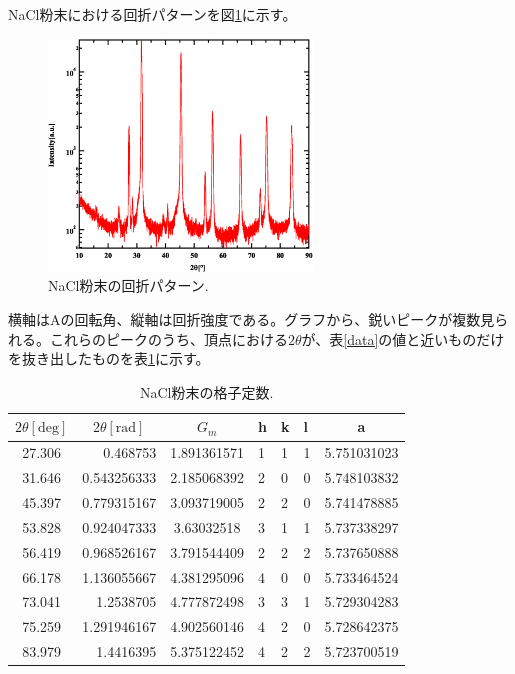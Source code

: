 \documentclass[11pt,a4j,uplatex]{jsarticle}
\begin{document}
NaCl粉末における回折パターンを図\ref{powder}に示す。

\begin{figure}[htb]
 \centering
 \includegraphics[clip,width=7cm]{FigPowder.eps}
 \caption{NaCl粉末の回折パターン.}
 \label{powder}
\end{figure}

横軸はAの回転角、縦軸は回折強度である。グラフから、鋭いピークが複数見られる。これらのピークのうち、頂点における$2\theta$が、表\ref{data}の値と近いものだけを抜き出したものを表\ref{pow}に示す。

\begin{table}[htbp]
 \begin{center}
  \caption{NaCl粉末の格子定数.}
  \begin{tabular}{|c|r|c|lll|c|}  \hline
   $2\theta[\mathrm{deg}]$ & \multicolumn{1}{c|}{$2\theta[\mathrm{rad}]$} & $G_{m}$     & h & k & l & a           \\ \hline  \hline
   27.306                  & 0.468753                                     & 1.891361571 & 1 & 1 & 1 & 5.751031023 \\
   31.646                  & 0.543256333                                  & 2.185068392 & 2 & 0 & 0 & 5.748103832 \\
   45.397                  & 0.779315167                                  & 3.093719005 & 2 & 2 & 0 & 5.741478885 \\
   53.828                  & 0.924047333                                  & 3.63032518  & 3 & 1 & 1 & 5.737338297 \\
   56.419                  & 0.968526167                                  & 3.791544409 & 2 & 2 & 2 & 5.737650888 \\
   66.178                  & 1.136055667                                  & 4.381295096 & 4 & 0 & 0 & 5.733464524 \\
   73.041                  & 1.2538705                                    & 4.777872498 & 3 & 3 & 1 & 5.729304283 \\
   75.259                  & 1.291946167                                  & 4.902560146 & 4 & 2 & 0 & 5.728642375 \\
   83.979                  & 1.4416395                                    & 5.375122452 & 4 & 2 & 2 & 5.723700519 \\  \hline
  \end{tabular}
  \label{pow}
 \end{center}
\end{table}
\end{document}
